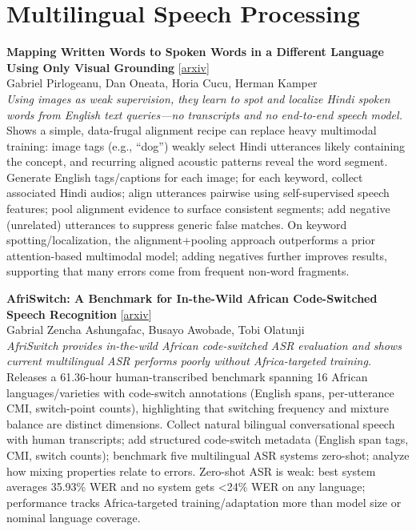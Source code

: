 \documentclass[12pt,letterpaper]{article}
\begin{document}
\medskip


\section*{Multilingual Speech Processing}

{\small\textbf{Mapping Written Words to Spoken Words in a Different Language Using Only Visual Grounding}} {\scriptsize[\href{https://arxiv.org/abs/2608.26925}{arxiv}]}\\
{\scriptsize Gabriel Pirlogeanu, Dan Oneata, Horia Cucu, Herman Kamper}\\

{\small\textit{Using images as weak supervision, they learn to spot and localize Hindi spoken words from English text queries---no transcripts and no end-to-end speech model.}}\\[1pt]
{\footnotesize Shows a simple, data-frugal alignment recipe can replace heavy multimodal training: image tags (e.g., ``dog'') weakly select Hindi utterances likely containing the concept, and recurring aligned acoustic patterns reveal the word segment. Generate English tags/captions for each image; for each keyword, collect associated Hindi audios; align utterances pairwise using self-supervised speech features; pool alignment evidence to surface consistent segments; add negative (unrelated) utterances to suppress generic false matches. On keyword spotting/localization, the alignment+pooling approach outperforms a prior attention-based multimodal model; adding negatives further improves results, supporting that many errors come from frequent non-word fragments.}

\medskip

{\small\textbf{AfriSwitch: A Benchmark for In-the-Wild African Code-Switched Speech Recognition}} {\scriptsize[\href{https://arxiv.org/abs/2608.26434}{arxiv}]}\\
{\scriptsize Gabrial Zencha Ashungafac, Busayo Awobade, Tobi Olatunji}\\

{\small\textit{AfriSwitch provides in-the-wild African code-switched ASR evaluation and shows current multilingual ASR performs poorly without Africa-targeted training.}}\\[1pt]
{\footnotesize Releases a 61.36-hour human-transcribed benchmark spanning 16 African languages/varieties with code-switch annotations (English spans, per-utterance CMI, switch-point counts), highlighting that switching frequency and mixture balance are distinct dimensions. Collect natural bilingual conversational speech with human transcripts; add structured code-switch metadata (English span tags, CMI, switch counts); benchmark five multilingual ASR systems zero-shot; analyze how mixing properties relate to errors. Zero-shot ASR is weak: best system averages 35.93\% WER and no system gets <24\% WER on any language; performance tracks Africa-targeted training/adaptation more than model size or nominal language coverage.}
\end{document}
